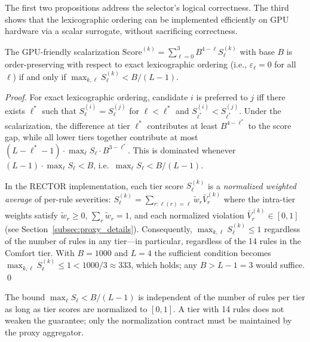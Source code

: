 The first two propositions address the selector's logical correctness.  The third shows that the lexicographic ordering can be implemented efficiently on GPU hardware via a scalar surrogate, without sacrificing correctness.

\begin{proposition}
\label{thm:scalarization}
The GPU-friendly scalarization $\mathrm{Score}^{(k)} = \sum_{\ell=0}^{3} B^{4-\ell} S_\ell^{(k)}$ with base $B$ is order-preserving with respect to exact lexicographic ordering (i.e., $\varepsilon_\ell = 0$ for all $\ell$) if and only if $\max_{k,\ell} S_\ell^{(k)} < B/(L-1)$.
\end{proposition}
\begin{proof}
For exact lexicographic ordering, candidate $i$ is preferred to $j$ iff there exists $\ell^*$ such that $S_\ell^{(i)} = S_\ell^{(j)}$ for $\ell < \ell^*$ and $S_{\ell^*}^{(i)} < S_{\ell^*}^{(j)}$. Under the scalarization, the difference at tier $\ell^*$ contributes at least $B^{4-\ell^*}$ to the score gap, while all lower tiers together contribute at most $(L - \ell^* - 1) \cdot \max_\ell S_\ell \cdot B^{3-\ell^*}$. This is dominated whenever $(L-1) \cdot \max_\ell S_\ell < B$, i.e.\ $\max_\ell S_\ell < B/(L-1)$.

In the RECTOR implementation, each tier score $S_\ell^{(k)}$ is a \emph{normalized weighted average} of per-rule severities: $S_\ell^{(k)} = \sum_{r:\ell(r)=\ell} \tilde{w}_r \bar{V}_r^{(k)}$ where the intra-tier weights satisfy $\tilde{w}_r \ge 0$, $\sum_r \tilde{w}_r = 1$, and each normalized violation $\bar{V}_r^{(k)} \in [0,1]$ (see Section~\ref{subsec:proxy_details}). Consequently, $\max_{k,\ell} S_\ell^{(k)} \leq 1$ regardless of the number of rules in any tier---in particular, regardless of the 14 rules in the Comfort tier. With $B = 1000$ and $L = 4$ the sufficient condition becomes $\max_{k,\ell} S_\ell^{(k)} \leq 1 < 1000/3 \approx 333$, which holds; any $B > L - 1 = 3$ would suffice. \qed
\end{proof}

\begin{corollary}
The bound $\max_\ell S_\ell < B/(L-1)$ is independent of the number of rules per tier as long as tier scores are normalized to $[0,1]$. A tier with 14 rules does not weaken the guarantee; only the normalization contract must be maintained by the proxy aggregator.
\end{corollary}

